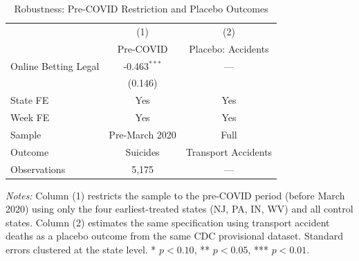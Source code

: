 \begin{table}[H]
\centering
\caption{Robustness: Pre-COVID Restriction and Placebo Outcomes}
\begin{threeparttable}
\begin{tabular}{lcc}
\toprule
 & (1) & (2) \\
 & Pre-COVID & Placebo: Accidents \\
\midrule
Online Betting Legal & -0.463$^{***}$ & --- \\
 & (0.146) &  \\
\midrule
State FE & Yes & Yes \\
Week FE & Yes & Yes \\
Sample & Pre-March 2020 & Full \\
Outcome & Suicides & Transport Accidents \\
Observations & 5,175 & --- \\
\bottomrule
\end{tabular}
\begin{tablenotes}[flushleft]
\small
\item \textit{Notes:} Column (1) restricts the sample to the pre-COVID period (before March 2020) using only the four earliest-treated states (NJ, PA, IN, WV) and all control states. Column (2) estimates the same specification using transport accident deaths as a placebo outcome from the same CDC provisional dataset. Standard errors clustered at the state level. * $p<0.10$, ** $p<0.05$, *** $p<0.01$.
\end{tablenotes}
\end{threeparttable}
\label{tab:robust}
\end{table}

